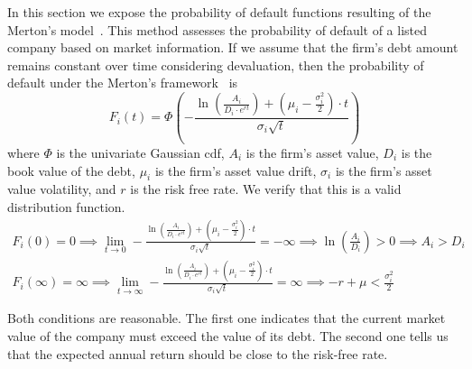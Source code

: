 \documentclass[11pt,fleqn]{book} %
\begin{document}
In this section we expose the probability of default functions resulting of the
Merton's model~\cite[sec. 3.3]{bluhm:2002}. This method assesses the probability 
of default of a listed company based on market information. 
If we assume that the firm's debt amount remains constant over time considering 
devaluation, then the probability of default under the Merton's 
framework~\cite{kmv:2003} is
\begin{displaymath}
	F_i(t) = \Phi\left( -\frac{\ln\left(\frac{A_i}{D_i \cdot e^{rt}} \right) + 
	\left(\mu_i-\frac{\sigma_{i}^2}{2}\right)\cdot t}{\sigma_{i}\sqrt{t}}\right)
\end{displaymath}
where $\Phi$ is the univariate Gaussian cdf, $A_i$ is the firm's asset value, 
$D_i$ is the book value of the debt, $\mu_i$ is the firm's asset value drift, 
$\sigma_i$ is the firm's asset value volatility, and $r$ is the risk free rate. 
We verify that this is a valid distribution function.
\begin{displaymath}
	\begin{array}{l}
		F_i(0) = 0 
		\implies 
		\displaystyle\lim_{t \to 0} -\frac{\ln\left(\frac{A_i}{D_i \cdot e^{rt}} \right) + 
		\left(\mu_i-\frac{\sigma_{i}^2}{2}\right)\cdot t}{\sigma_{i}\sqrt{t}} = -\infty
		\implies
		\ln\left(\frac{A_i}{D_i}\right) > 0
		\implies
		A_i > D_i
		\\
		F_i(\infty) = \infty
		\implies 
		\displaystyle\lim_{t \to \infty} -\frac{\ln\left(\frac{A_i}{D_i \cdot e^{rt}} \right) + 
		\left(\mu_i-\frac{\sigma_{i}^2}{2}\right)\cdot t}{\sigma_{i}\sqrt{t}} = \infty
		\implies
		-r + \mu < \frac{\sigma_i^2}{2}
	\end{array}
\end{displaymath}

Both conditions are reasonable. The first one indicates that the current market 
value of the company must exceed the value of its debt. The second one tells us 
that the expected annual return should be close to the risk-free rate.
\end{document}

